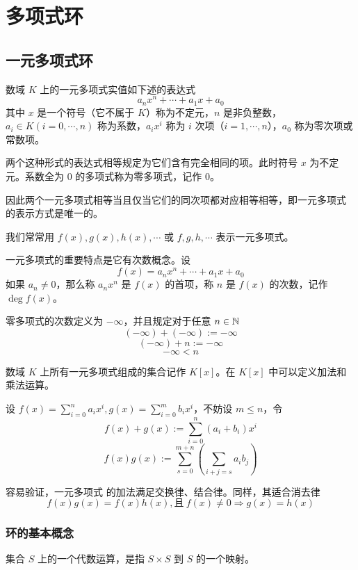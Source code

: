 \chapter{多项式环}

\section{一元多项式环}

\begin{definition}
    数域 $K$ 上的一元多项式实值如下述的表达式
    $$a_nx^n+\cdots + a_1x + a_0$$
    其中 $x$ 是一个符号（它不属于 $K$）称为不定元，$n$ 是非负整数，$a_i\in K(i=0,\cdots,n)$ 称为系数，$a_ix^i$ 称为 $i$ 次项（$i=1,\cdots,n$），$a_0$ 称为零次项或常数项。
\end{definition}

两个这种形式的表达式相等规定为它们含有完全相同的项。此时符号 $x$ 为不定元。系数全为 $0$ 的多项式称为零多项式，记作 $0$。

因此两个一元多项式相等当且仅当它们的同次项都对应相等相等，即一元多项式 的表示方式是唯一的。

我们常常用 $f(x),g(x),h(x),\cdots$ 或 $f,g,h,\cdots$ 表示一元多项式。

一元多项式的重要特点是它有次数概念。设
$$f(x) = a_nx^n+\cdots + a_1x + a_0$$
如果 $a_n\ne 0$，那么称 $a_nx^n$ 是 $f(x)$ 的首项，称 $n$ 是 $f(x)$ 的次数，记作 $\deg f(x)$。

零多项式的次数定义为 $-\infty$，并且规定对于任意 $n\in \mathbb{N}$
$$(-\infty)+(-\infty):=-\infty$$
$$(-\infty) +n := -\infty$$
$$-\infty < n$$

数域 $K$ 上所有一元多项式组成的集合记作 $K[x]$。在 $K[x]$ 中可以定义加法和乘法运算。

设 $f(x) = \sum_{i=0}^na_ix^i,g(x) = \sum_{i=0}^mb_ix^i$，不妨设 $m \leqslant n$，令
$$f(x) + g(x) := \sum_{i=0}^n(a_i+b_i)x^i$$
$$f(x)g(x) := \sum_{s=0}^{m+n}\left(\sum_{i+j=s}a_ib_j\right)$$

容易验证，一元多项式 的加法满足交换律、结合律。同样，其适合消去律
$$f(x)g(x) = f(x)h(x),\text{且}\ f(x)\ne 0 \Rightarrow g(x) = h(x)$$

\subsection{环的基本概念}

集合 $S$ 上的一个代数运算，是指 $S\times S$ 到 $S$ 的一个映射。

